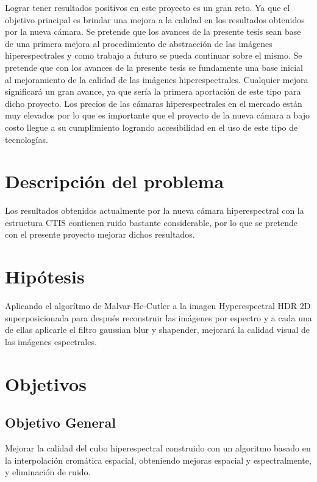 Lograr tener resultados positivos en este proyecto es un gran reto. Ya que el objetivo principal es brindar una mejora a la calidad en los resultados obtenidos por la nueva cámara.
Se pretende que los avances de la presente tesis sean base de una primera mejora al procedimiento de abstracción de las imágenes hiperespectrales y como trabajo a futuro se pueda continuar sobre el mismo.
Se pretende que con los avances de la presente tesis se fundamente una base inicial al mejoramiento de la calidad de las imágenes hiperespectrales.
Cualquier mejora significará un gran avance, ya que sería la primera aportación de este tipo para dicho proyecto. Los precios de las cámaras hiperespectrales en el mercado están muy elevados por lo que es importante que el proyecto de la nueva cámara a bajo costo llegue a su cumplimiento logrando accesibilidad en el uso de este tipo de tecnologías. 

\section{Descripción del problema}
Los resultados obtenidos actualmente por la nueva cámara hiperespectral \cite{JairoCamera} con la estructura CTIS contienen ruido bastante considerable, por lo que se pretende con el presente proyecto mejorar dichos resultados.

\section{Hipótesis}

Aplicando el algorítmo de Malvar-He-Cutler a la imagen Hyperespectral HDR 2D superposicionada para después reconstruir las imágenes por espectro y a cada una de ellas aplicarle el filtro gaussian blur y shapender, mejorará la calidad visual de las imágenes espectrales.

\section{Objetivos}
\subsection{Objetivo General} 
Mejorar la calidad del cubo hiperespectral construido con un algoritmo basado en la interpolación cromática espacial, obteniendo mejoras espacial y espectralmente, y eliminación de ruido.

